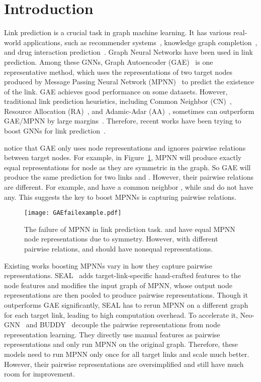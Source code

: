 \documentclass{article}
\theoremstyle{plain}
\theoremstyle{definition}
\theoremstyle{remark}
\begin{document}
\section{Introduction}
\label{sec::introduction}
Link prediction is a crucial task in graph machine learning. It has various real-world applications, such as recommender systems~\citep{Zhang2020}, knowledge graph completion~\citep{NBFNet}, and drug interaction prediction~\citep{DrugInteraction}. Graph Neural Networks have been used in link prediction. Among these GNNs, Graph Autoencoder (GAE)~\citep{GAE} is one representative method, which uses the representations of two target nodes produced by Message Passing Neural Network (MPNN)~\citep{MPNN} to predict the existence of the link. GAE achieves good performance on some datasets. However, traditional link prediction heuristics, including Common Neighbor (CN)~\citep{CommonNeighbor}, Resource Allocation (RA)~\citep{RA}, and Adamic-Adar (AA)~\citep{AA}, sometimes can outperform GAE/MPNN by large margins~\citep{zhang2021labeling}. Therefore, recent works have been trying to boost GNNs for link prediction~\citep{SEAL,NBFNet,Neo-GNN,Gsketch}. 

\citet{zhang2021labeling} notice that GAE only uses node representations and ignores pairwise relations between target nodes. For example, in Figure~\ref{fig:GAEfailure}, MPNN will produce exactly equal representations for node  as they are symmetric in the graph. So GAE will produce the same prediction for two links  and . However, their pairwise relations are different. For example,  and  have a common neighbor , while  and  do not have any. This suggests the key to boost MPNNs is capturing pairwise relations.
\begin{figure}
\vskip 0.1in
    \centering
    \texttt{[image: GAEfailexample.pdf]}
    \caption{The failure of MPNN in link prediction task.  and  have equal MPNN node representations due to symmetry. However, with different pairwise relations,  and  should have nonequal representations.}
    \label{fig:GAEfailure}
\vskip -0.2in
\end{figure}

Existing works boosting MPNNs vary in how they capture pairwise representations. SEAL~\citep{SEAL} adds target-link-specific hand-crafted features to the node features and modifies the input graph of MPNN, whose output node representations are then pooled to produce pairwise representations. Though it outperforms GAE significantly, SEAL has to rerun MPNN on a different graph for each target link, leading to high computation overhead. To accelerate it,  Neo-GNN~\citep{Neo-GNN} and BUDDY~\citep{Gsketch} decouple the pairwise representations from node representation learning. They directly use manual features as pairwise representations and only run MPNN on the original graph. Therefore, these models need to run MPNN only once for all target links and scale much better. However, their pairwise representations are oversimplified and still have much room for improvement. 
\end{document}
